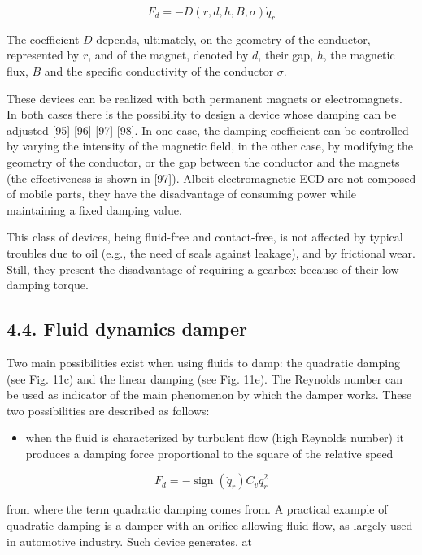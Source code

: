 \documentclass[10pt]{article}
\begin{document}
\begin{equation*}
F_{d}=-D(r, d, h, B, \sigma) \dot{q}_{r} \tag{4}
\end{equation*}


The coefficient $D$ depends, ultimately, on the geometry of the conductor, represented by $r$, and of the magnet, denoted by $d$, their gap, $h$, the magnetic flux, $B$ and the specific conductivity of the conductor $\sigma$.

These devices can be realized with both permanent magnets or electromagnets. In both cases there is the possibility to design a device whose damping can be adjusted [95] [96] [97] [98]. In one case, the damping coefficient can be controlled by varying the intensity of the magnetic field, in the other case, by modifying the geometry of the conductor, or the gap between the conductor and the magnets (the effectiveness is shown in [97]). Albeit electromagnetic ECD are not composed of mobile parts, they have the disadvantage of consuming power while maintaining a fixed damping value.

This class of devices, being fluid-free and contact-free, is not affected by typical troubles due to oil (e.g., the need of seals against leakage), and by frictional wear. Still, they present the disadvantage of requiring a gearbox because of their low damping torque.

\subsection*{4.4. Fluid dynamics damper}
Two main possibilities exist when using fluids to damp: the quadratic damping (see Fig. 11c) and the linear damping (see Fig. 11e). The Reynolds number can be used as indicator of the main phenomenon by which the damper works. These two possibilities are described as follows:

\begin{itemize}
  \item when the fluid is characterized by turbulent flow (high Reynolds number) it produces a damping force proportional to the square of the relative speed
\end{itemize}


\begin{equation*}
F_{d}=-\operatorname{sign}\left(\dot{q}_{r}\right) C_{v} \dot{q}_{r}^{2} \tag{5}
\end{equation*}


from where the term quadratic damping comes from. A practical example of quadratic damping is a damper with an orifice allowing fluid flow, as largely used in automotive industry. Such device generates, at
\end{document}
